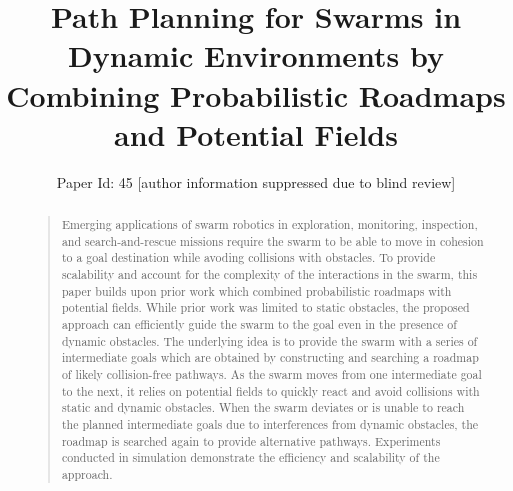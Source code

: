 

 
%
\title{Path Planning for Swarms in Dynamic Environments by\\ Combining Probabilistic Roadmaps and
  Potential Fields}
\author{Paper Id: 45 [author information suppressed due to blind review]
}
\maketitle
\begin{abstract}
\begin{quote}
Emerging applications of swarm robotics in exploration, monitoring,
inspection, and search-and-rescue missions require the swarm to be
able to move in cohesion to a goal destination while avoding
collisions with obstacles.  To provide scalability and account for the
complexity of the interactions in the swarm, this paper builds upon
prior work which combined probabilistic roadmaps with potential
fields. While prior work was limited to static obstacles, the proposed
approach can efficiently guide the swarm to the goal even in the
presence of dynamic obstacles. The underlying idea is to provide the
swarm with a series of intermediate goals which are obtained by
constructing and searching a roadmap of likely collision-free
pathways. As the swarm moves from one intermediate goal to the next,
it relies on potential fields to quickly react and avoid collisions
with static and dynamic obstacles.  When the swarm deviates or is
unable to reach the planned intermediate goals due to interferences
from dynamic obstacles, the roadmap is searched again to provide
alternative pathways. Experiments conducted in simulation demonstrate
the efficiency and scalability of the approach.

\end{quote}
\end{abstract}



